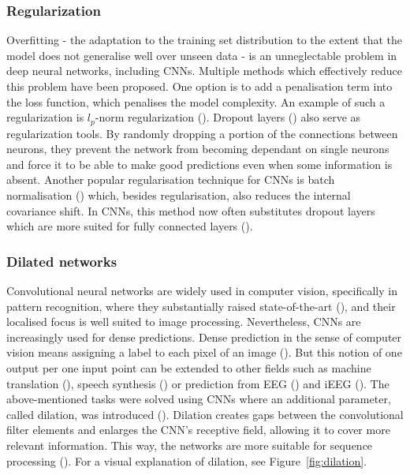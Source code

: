 \subsubsection{Regularization}
Overfitting - the adaptation to the training set distribution to the extent that the model does not generalise well over unseen data - is an unneglectable problem in deep neural networks, including CNNs.
Multiple methods which effectively reduce this problem have been proposed.
One option is to add a penalisation term into the loss function, which penalises the model complexity.
An example of such a regularization is $l_p$-norm regularization (\cite{cnn-description}).
Dropout layers (\cite{drop-out}) also serve as regularization tools. 
By randomly dropping a portion of the connections between neurons, they prevent the network from becoming dependant on single neurons and force it to be able to make good predictions even when some information is absent.
Another popular regularisation technique for CNNs is batch normalisation (\cite{batch-norm}) which, besides regularisation, also reduces the internal covariance shift. 
In CNNs, this method now often substitutes dropout layers which are more suited for fully connected layers (\cite{cnn-description}).


\subsubsection{Dilated networks}\label{subsec:dilated-networks}
Convolutional neural networks are widely used in computer vision, specifically in pattern recognition, where they substantially raised state-of-the-art (\cite{alexnet, dnn-computer-vision}), and their localised focus is well suited to image processing.
Nevertheless, CNNs are increasingly used for dense predictions.
Dense prediction in the sense of computer vision means assigning a label to each pixel of an image (\cite{dense-prediction-images}).
But this notion of one output per one input point can be extended to other fields such as machine translation (\cite{dense-prediction-machine-translation}), speech synthesis (\cite{angrick-speech-2018}) or prediction from EEG (\cite{schirrmeister-deep-2017}) and iEEG (\cite{Hammer-2021}).
The above-mentioned tasks were solved using CNNs where an additional parameter, called dilation, was introduced (\cite{dense-prediction-images}).
Dilation creates gaps between the convolutional filter elements and enlarges the CNN's receptive field, allowing it to cover more relevant information.
This way, the networks are more suitable for sequence processing (\cite{cnn-description}).
For a visual explanation of dilation, see Figure~\ref{fig:dilation}.

